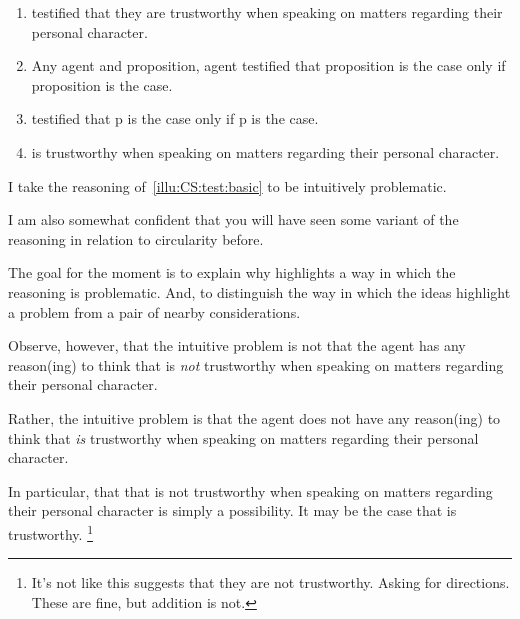 \begin{note}[Testimony 1]
  \begin{illustration}[Testimony 1]
    \label{illu:CS:test:basic}
    \mbox{}
    \begin{enumerate}[label=\arabic*., ref=(\arabic*)]
    \item\label{ex:eiS:t:basic:test}  testified that they are trustworthy when speaking on matters regarding their personal character.
    \item Any agent and proposition, agent testified that proposition is the case only if proposition is the case.
    \item {} testified that p is the case only if p is the case.
    \item\label{ex:eiS:t:basic:ok}  is trustworthy when speaking on matters regarding their personal character.
    \end{enumerate}
  \end{illustration}

  I take the reasoning of~\autoref{illu:CS:test:basic} to be intuitively problematic.

  I am also somewhat confident that you will have seen some variant of the reasoning in relation to circularity before.

  The goal for the moment is to explain why \ideaCS{} highlights a way in which the reasoning is problematic.
  And, to distinguish the way in which the ideas highlight a problem from a pair of nearby considerations.
\end{note}

\begin{note}
  Observe, however, that the intuitive problem is not that the agent has any reason(ing) to think that  is \emph{not} trustworthy when speaking on matters regarding their personal character.

  Rather, the intuitive problem is that the agent does not have any reason(ing) to think that  \emph{is} trustworthy when speaking on matters regarding their personal character.

  In particular, that that  is not trustworthy when speaking on matters regarding their personal character is simply a possibility.
  It may be the case that  is trustworthy.\nolinebreak
  \footnote{
    \color{red}
    It's not like this suggests that they are not trustworthy.
    Asking for directions.
    These are fine, but addition is not.
  }
\end{note}

